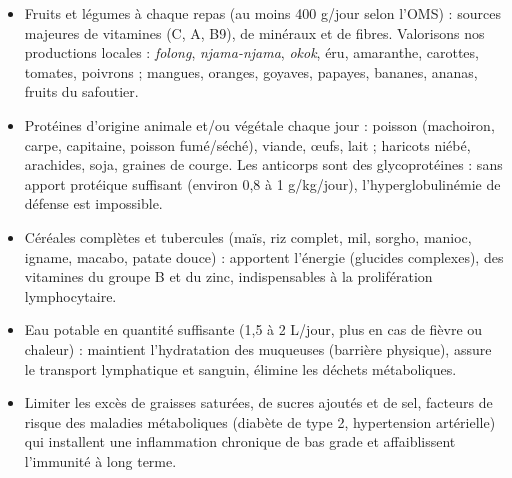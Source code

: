 \documentclass[11pt]{article}
\newcommand{\cle}[1]{{\popxbold\color{popdark}#1}}
\begin{document}
\begin{aretenir}
\begin{itemize}
\item \cle{Fruits et légumes} à chaque repas (au moins 400 g/jour selon l'OMS) : sources majeures de vitamines (C, A, B9), de minéraux et de fibres. Valorisons nos productions locales : \emph{folong}, \emph{njama-njama}, \emph{okok}, éru, amaranthe, carottes, tomates, poivrons ; mangues, oranges, goyaves, papayes, bananes, ananas, fruits du safoutier.
\item \cle{Protéines} d'origine animale et/ou végétale chaque jour : poisson (machoiron, carpe, capitaine, poisson fumé/séché), viande, œufs, lait ; haricots niébé, arachides, soja, graines de courge. Les anticorps sont des glycoprotéines : sans apport protéique suffisant (environ 0,8 à 1 g/kg/jour), l'hyperglobulinémie de défense est impossible.
\item \cle{Céréales complètes et tubercules} (maïs, riz complet, mil, sorgho, manioc, igname, macabo, patate douce) : apportent l'énergie (glucides complexes), des vitamines du groupe B et du zinc, indispensables à la prolifération lymphocytaire.
\item \cle{Eau potable} en quantité suffisante (1,5 à 2 L/jour, plus en cas de fièvre ou chaleur) : maintient l'hydratation des muqueuses (barrière physique), assure le transport lymphatique et sanguin, élimine les déchets métaboliques.
\item Limiter les excès de graisses saturées, de sucres ajoutés et de sel, facteurs de risque des maladies métaboliques (diabète de type 2, hypertension artérielle) qui installent une inflammation chronique de bas grade et affaiblissent l'immunité à long terme.
\end{itemize}
\end{aretenir}
\end{document}
